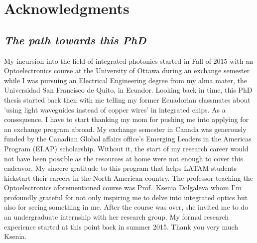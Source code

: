 

\chapter*{Acknowledgments}

\section*{\textit{The path towards this PhD}}

My incursion into the field of integrated photonics started in Fall of 2015 with an Optoelectronics course at the University of Ottawa during an exchange semester while I was pursuing an Electrical Engineering degree from my alma mater, the Universidad San Francisco de Quito, in Ecuador.
Looking back in time, this PhD thesis started back then with me telling my former Ecuadorian classmates about 'using light waveguides instead of copper wires' in integrated chips.
As a consequence, I have to start thanking my mom for pushing me into applying for an exchange program abroad.
My exchange semester in Canada was generously funded by the Canadian Global affairs office's Emerging Leaders in the Americas Program (ELAP) scholarship.
Without it, the start of my research career would not have been possible as the resources at home were not enough to cover this endeavor.
My sincere gratitude to this program that helps LATAM students kickstart their careers in the North American country.
The professor teaching the Optoelectronics aforementioned course was Prof.~Ksenia Dolgaleva whom I'm profoundly grateful for not only inspiring me to delve into integrated optics but also for seeing something in me.
After the course was over, she invited me to do an undergraduate internship with her research group.
My formal research experience started at this point back in summer 2015.
Thank you very much Ksenia.

